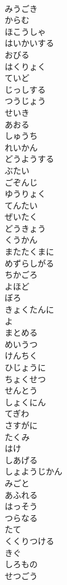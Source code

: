 \documentclass[8pt]{extreport}
\begin{document}
\begin{CJK}{UTF8}{min}
\\	みうごき
\\	からむ
\\	ほこうしゃ
\\	はいかいする
\\	おびる
\\	はくりょく
\\	ていど
\\	じっしする
\\	つうじょう
\\	せいき
\\	あおる
\\	しゅうち
\\	れいかん
\\	どうようする
\\	ぶたい
\\	ごぞんじ
\\	ゆうりょく
\\	てんたい
\\	ぜいたく
\\	どうきょう
\\	くうかん
\\	またたくまに
\\	めずらしがる
\\	ちかごろ
\\	よほど
\\	ぼろ
\\	きょくたんに
\\	よ
\\	まとめる
\\	めいうつ
\\	けんちく
\\	ひじょうに
\\	ちょくせつ
\\	せんとう
\\	しょくにん
\\	てぎわ
\\	さすがに
\\	たくみ
\\	はけ
\\	しあげる
\\	しょようじかん
\\	みごと
\\	あふれる
\\	はっそう
\\	つらなる
\\	たて
\\	くくりつける
\\	きぐ
\\	しろもの
\\	せつごう

\end{CJK}
\end{document}
